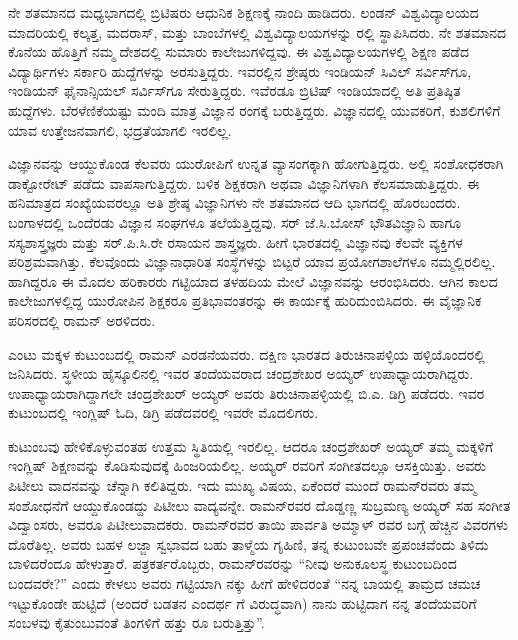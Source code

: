 ನೇ ಶತಮಾನದ ಮಧ್ಯಭಾಗದಲ್ಲಿ ಬ್ರಿಟಿಷರು ಆಧುನಿಕ ಶಿಕ್ಷಣಕ್ಕೆ ನಾಂದಿ ಹಾಡಿದರು. ಲಂಡನ್ ವಿಶ್ವವಿದ್ಯಾಲಯದ ಮಾದರಿಯಲ್ಲಿ ಕಲ್ಕತ್ತ, ಮದರಾಸ್, ಮತ್ತು ಬಾಂಬೆಗಳಲ್ಲಿ ವಿಶ್ವವಿದ್ಯಾಲಯಗಳನ್ನು ರಲ್ಲಿ ಸ್ಥಾಪಿಸಿದರು. ನೇ ಶತಮಾನದ ಕೊನೆಯ ಹೊತ್ತಿಗೆ ನಮ್ಮ ದೇಶದಲ್ಲಿ ಸುಮಾರು  ಕಾಲೇಜುಗಳಿದ್ದವು. ಈ ವಿಶ್ವವಿದ್ಯಾಲಯಗಳಲ್ಲಿ ಶಿಕ್ಷಣ ಪಡೆದ ವಿದ್ಯಾರ್ಥಿಗಳು ಸರ್ಕಾರಿ ಹುದ್ದೆಗಳನ್ನು ಅರಸುತ್ತಿದ್ದರು. ಇವರಲ್ಲಿನ ಶ್ರೇಷ್ಠರು ಇಂಡಿಯನ್ ಸಿವಿಲ್ ಸರ್ವಿಸ್‍ಗೂ, ಇಂಡಿಯನ್ ಫೈನಾನ್ಸಿಯಲ್ ಸರ್ವಿಸ್‍ಗೂ ಸೇರುತ್ತಿದ್ದರು. ಇವೆರಡೂ ಬ್ರಿಟಿಷ್ ಇಂಡಿಯಾದಲ್ಲಿ ಅತಿ ಪ್ರತಿಷ್ಠಿತ ಹುದ್ದೆಗಳು. ಬೆರಳೆಣಿಕೆಯಷ್ಟು ಮಂದಿ ಮಾತ್ರ ವಿಜ್ಞಾನ ರಂಗಕ್ಕೆ ಬರುತ್ತಿದ್ದರು. ವಿಜ್ಞಾನದಲ್ಲಿ ಯುವಕರಿಗೆ, ಕುಶಲಿಗಳಿಗೆ ಯಾವ ಉತ್ತೇಜನವಾಗಲಿ, ಭದ್ರತೆಯಾಗಲಿ ಇರಲಿಲ್ಲ.

ವಿಜ್ಞಾನವನ್ನು ಆಯ್ದುಕೊಂಡ ಕೆಲವರು ಯುರೋಪಿಗೆ ಉನ್ನತ ವ್ಯಾಸಂಗಕ್ಕಾಗಿ ಹೋಗುತ್ತಿದ್ದರು. ಅಲ್ಲಿ ಸಂಶೋಧಕರಾಗಿ ಡಾಕ್ಟೋರೇಟ್ ಪಡೆದು ವಾಪಸಾಗುತ್ತಿದ್ದರು. ಬಳಿಕ ಶಿಕ್ಷಕರಾಗಿ ಅಥವಾ ವಿಜ್ಞಾನಿಗಳಾಗಿ ಕೆಲಸಮಾಡುತ್ತಿದ್ದರು. ಈ ಹನಿಮಾತ್ರದ ಸಂಖ್ಯೆಯವರಲ್ಲೂ ಅತಿ ಶ್ರೇಷ್ಠ ವಿಜ್ಞಾನಿಗಳು ನೇ ಶತಮಾನದ ಆದಿ ಭಾಗದಲ್ಲಿ ಹೊರಬಂದರು. ಬಂಗಾಳದಲ್ಲಿ ಒಂದೆರಡು ವಿಜ್ಞಾನ ಸಂಘಗಳೂ ತಲೆಯೆತ್ತಿದ್ದವು. ಸರ್ ಜೆ.ಸಿ.ಬೋಸ್ ಭೌತವಿಜ್ಞಾನಿ ಹಾಗೂ ಸಸ್ಯಶಾಸ್ತ್ರಜ್ಞರು ಮತ್ತು ಸರ್.ಪಿ.ಸಿ.ರೇ ರಸಾಯನ ಶಾಸ್ತ್ರಜ್ಞರು. ಹೀಗೆ ಭಾರತದಲ್ಲಿ ವಿಜ್ಞಾನವು ಕೆಲವೇ ವ್ಯಕ್ತಿಗಳ ಪರಿಶ್ರಮವಾಗಿತ್ತು. ಕೆಲವೊಂದು ವಿಜ್ಞಾನಾಧಾರಿತ ಸಂಸ್ಥೆಗಳನ್ನು ಬಿಟ್ಟರೆ ಯಾವ ಪ್ರಯೋಗಶಾಲೆಗಳೂ ನಮ್ಮಲ್ಲಿರಲಿಲ್ಲ. ಹಾಗಿದ್ದರೂ ಈ ಮೊದಲ ಹರಿಕಾರರು ಗಟ್ಟಿಯಾದ ತಳಹದಿಯ ಮೇಲೆ ವಿಜ್ಞಾನವನ್ನು ಆರಂಭಿಸಿದರು. ಆಗಿನ ಕಾಲದ ಕಾಲೇಜುಗಳಲ್ಲಿದ್ದ ಯುರೋಪಿನ ಶಿಕ್ಷಕರೂ ಪ್ರತಿಭಾವಂತರನ್ನು ಈ ಕಾರ್ಯಕ್ಕೆ ಹುರಿದುಂಬಿಸಿದರು. ಈ ವೈಜ್ಞಾನಿಕ ಪರಿಸರದಲ್ಲಿ ರಾಮನ್ ಅರಳಿದರು.



ಎಂಟು ಮಕ್ಕಳ ಕುಟುಂಬದಲ್ಲಿ ರಾಮನ್ ಎರಡನೆಯವರು. ದಕ್ಷಿಣ ಭಾರತದ ತಿರುಚಿನಾಪಳ್ಳಿಯ ಹಳ್ಳಿಯೊಂದರಲ್ಲಿ ಜನಿಸಿದರು. ಸ್ಥಳೀಯ ಹೈಸ್ಕೂಲಿನಲ್ಲಿ ಇವರ ತಂದೆಯವರಾದ ಚಂದ್ರಶೇಖರ ಅಯ್ಯರ್ ಉಪಾಧ್ಯಾಯರಾಗಿದ್ದರು. ಉಪಾಧ್ಯಾಯರಾಗಿದ್ದಾಗಲೇ ಚಂದ್ರಶೇಖರ್ ಅಯ್ಯರ್ ಅವರು ತಿರುಚಿನಾಪಳ್ಳಿಯಲ್ಲಿ ಬಿ.ಎ. ಡಿಗ್ರಿ ಪಡೆದರು. ಇವರ ಕುಟುಂಬದಲ್ಲಿ ಇಂಗ್ಲಿಷ್ ಓದಿ, ಡಿಗ್ರಿ ಪಡೆದವರಲ್ಲಿ ಇವರೇ ಮೊದಲಿಗರು.

ಕುಟುಂಬವು ಹೇಳಿಕೊಳ್ಳುವಂತಹ ಉತ್ತಮ ಸ್ಥಿತಿಯಲ್ಲಿ ಇರಲಿಲ್ಲ. ಆದರೂ ಚಂದ್ರಶೇಖರ್ ಅಯ್ಯರ್ ತಮ್ಮ ಮಕ್ಕಳಿಗೆ ಇಂಗ್ಲಿಷ್ ಶಿಕ್ಷಣವನ್ನು ಕೊಡಿಸುವುದಕ್ಕೆ ಹಿಂಜರಿಯಲಿಲ್ಲ. ಅಯ್ಯರ್ ರವರಿಗೆ ಸಂಗೀತದಲ್ಲೂ ಆಸಕ್ತಿಯಿತ್ತು. ಅವರು ಪಿಟೀಲು ವಾದನವನ್ನು ಚೆನ್ನಾಗಿ ಕಲಿತಿದ್ದರು. ಇದು ಮುಖ್ಯ ವಿಷಯ, ಏಕೆಂದರೆ ಮುಂದೆ ರಾಮನ್‍ರವರು ತಮ್ಮ ಸಂಶೋಧನೆಗೆ ಆಯ್ದುಕೊಂಡದ್ದು ಪಿಟೀಲು ವಾದ್ಯವನ್ನೇ. ರಾಮನ್‍ರವರ ದೊಡ್ಡಣ್ಣ ಸುಬ್ರಮಣ್ಯ ಅಯ್ಯರ್ ಸಹ ಸಂಗೀತ ವಿದ್ವಾಂಸರು, ಅವರೂ ಪಿಟೀಲುವಾದಕರು. ರಾಮನ್‍ರವರ ತಾಯಿ ಪಾರ್ವತಿ ಅಮ್ಮಾಳ್ ರವರ ಬಗ್ಗೆ ಹೆಚ್ಚಿನ ವಿವರಗಳು ದೊರೆತಿಲ್ಲ. ಅವರು ಬಹಳ ಲಜ್ಜಾ ಸ್ವಭಾವದ ಬಹು ತಾಳ್ಮೆಯ ಗೃಹಿಣಿ, ತನ್ನ ಕುಟುಂಬವೇ ಪ್ರಪಂಚವೆಂದು ತಿಳಿದು ಬಾಳಿದರೆಂದೂ ಹೇಳುತ್ತಾರೆ. ಪತ್ರಕರ್ತರೊಬ್ಬರು, ರಾಮನ್‍ರವರನ್ನು “ನೀವು ಅನುಕೂಲಸ್ಥ ಕುಟುಂಬದಿಂದ ಬಂದವರೇ?” ಎಂದು ಕೇಳಲು ಅವರು ಗಟ್ಟಿಯಾಗಿ ನಕ್ಕು ಹೀಗೆ ಹೇಳಿದರಂತೆ “ನನ್ನ ಬಾಯಲ್ಲಿ ತಾಮ್ರದ ಚಮಚ ಇಟ್ಟುಕೊಂಡೇ ಹುಟ್ಟಿದೆ (ಅಂದರೆ ಬಡತನ ಎಂದರ್ಥ ಗೆ ವಿರುದ್ಧವಾಗಿ) ನಾನು ಹುಟ್ಟಿದಾಗ ನನ್ನ ತಂದೆಯವರಿಗೆ ಸಂಬಳವು ಕೈತುಂಬುವಂತೆ ತಿಂಗಳಿಗೆ ಹತ್ತು ರೂ ಬರುತ್ತಿತ್ತು”.

